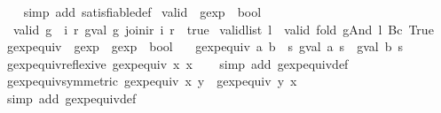 \begin{isabellebody}
%
\isadelimproof
\ \ %
\endisadelimproof
%
\isatagproof
{}\isamarkupfalse%
\ {\isacharparenleft}simp\ add{\isacharcolon}\ satisfiable{\isacharunderscore}def{\isacharparenright}%
\endisatagproof
{\isafoldproof}%
%
\isadelimproof
\isanewline
%
\endisadelimproof
\isanewline
{}\isamarkupfalse%
\ valid\ {\isacharcolon}{\isacharcolon}\ {\isachardoublequoteopen}gexp\ {\isasymRightarrow}\ bool{\isachardoublequoteclose}\ \isanewline
\ \ {\isachardoublequoteopen}valid\ g\ {\isasymequiv}\ {\isacharparenleft}{\isasymforall}i\ r{\isachardot}\ gval\ g\ {\isacharparenleft}join{\isacharunderscore}ir\ i\ r{\isacharparenright}\ {\isacharequal}\ true{\isacharparenright}{\isachardoublequoteclose}\isanewline
\isanewline
{}\isamarkupfalse%
\ {\isachardoublequoteopen}valid{\isacharunderscore}list\ l\ {\isacharequal}\ valid\ {\isacharparenleft}fold\ gAnd\ l\ {\isacharparenleft}Bc\ True{\isacharparenright}{\isacharparenright}{\isachardoublequoteclose}\isanewline
\isanewline
{}\isamarkupfalse%
\ gexp{\isacharunderscore}equiv\ {\isacharcolon}{\isacharcolon}\ {\isachardoublequoteopen}gexp\ {\isasymRightarrow}\ gexp\ {\isasymRightarrow}\ bool{\isachardoublequoteclose}\ \isanewline
\ \ {\isachardoublequoteopen}gexp{\isacharunderscore}equiv\ a\ b\ {\isasymequiv}\ {\isasymforall}s{\isachardot}\ gval\ a\ s\ {\isacharequal}\ gval\ b\ s{\isachardoublequoteclose}\isanewline
\isanewline
{}\isamarkupfalse%
\ gexp{\isacharunderscore}equiv{\isacharunderscore}reflexive{\isacharcolon}\ {\isachardoublequoteopen}gexp{\isacharunderscore}equiv\ x\ x{\isachardoublequoteclose}\isanewline
%
\isadelimproof
\ \ %
\endisadelimproof
%
\isatagproof
{}\isamarkupfalse%
\ {\isacharparenleft}simp\ add{\isacharcolon}\ gexp{\isacharunderscore}equiv{\isacharunderscore}def{\isacharparenright}%
\endisatagproof
{\isafoldproof}%
%
\isadelimproof
\isanewline
%
\endisadelimproof
\isanewline
{}\isamarkupfalse%
\ gexp{\isacharunderscore}equiv{\isacharunderscore}symmetric{\isacharcolon}\ {\isachardoublequoteopen}gexp{\isacharunderscore}equiv\ x\ y\ {\isasymLongrightarrow}\ gexp{\isacharunderscore}equiv\ y\ x{\isachardoublequoteclose}\isanewline
%
\isadelimproof
\ \ %
\endisadelimproof
%
\isatagproof
{}\isamarkupfalse%
\ {\isacharparenleft}simp\ add{\isacharcolon}\ gexp{\isacharunderscore}equiv{\isacharunderscore}def{\isacharparenright}%
\endisatagproof
{\isafoldproof}%
%
\isadelimproof
\isanewline
%
\endisadelimproof
\isanewline
{}\isamarkupfalse%

\end{isabellebody}
